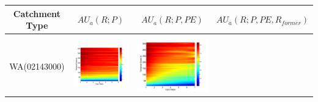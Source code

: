 \documentclass[draft,wrr]{AGUTeX}
\begin{document}
\begin{article}
\begin{table}[H] \small
\label{table:AAU}
\centering
\begin{tabular}{cccc}
\hline 
\textbf{Catchment Type}&\textbf{$AU_a(R;P)$}&\textbf{$AU_a(R;P,PE)$}&\textbf{$AU_a(R;P,PE,R_{former})$}\\
\hline
\\
WA(02143000)
&\begin{minipage}{.3\textwidth}\includegraphics[width=\linewidth]{resultgraph/02143000p_abs.png}\end{minipage}
&\begin{minipage}{.3\textwidth}\includegraphics[width=\linewidth]{resultgraph/02143000pep_abs.png}\end{minipage}

\end{tabular}
\end{table}
\end{article}
\end{document}
